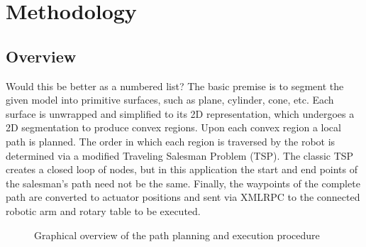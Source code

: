 \chapter{Methodology}\label{methodology}

\section{Overview}
Would this be better as a numbered list?
The basic premise is to segment the given model into primitive surfaces, such as plane, cylinder, cone, etc.
Each surface is unwrapped and simplified to its 2D representation, which undergoes a 2D segmentation to produce convex regions.
Upon each convex region a local path is planned.
The order in which each region is traversed by the robot is determined via a modified Traveling Salesman Problem (TSP).
The classic TSP creates a closed loop of nodes, but in this application the start and end points of the salesman's path need not be the same.
Finally, the waypoints of the complete path are converted to actuator positions and sent via XMLRPC to the connected robotic arm and rotary table to be executed.

\begin{figure}[h]
	\centering
{}
\caption{Graphical overview of the path planning and execution procedure}
\end{figure}

